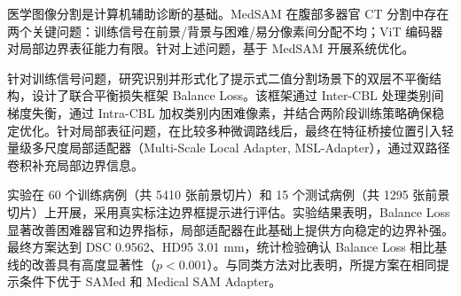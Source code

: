医学图像分割是计算机辅助诊断的基础。MedSAM 在腹部多器官 CT 分割中存在两个关键问题：训练信号在前景/背景与困难/易分像素间分配不均；ViT 编码器对局部边界表征能力有限。针对上述问题，基于 MedSAM 开展系统优化。

针对训练信号问题，研究识别并形式化了提示式二值分割场景下的双层不平衡结构，设计了联合平衡损失框架 Balance Loss。该框架通过 Inter-CBL 处理类别间梯度失衡，通过 Intra-CBL 加权类别内困难像素，并结合两阶段训练策略确保稳定优化。针对局部表征问题，在比较多种微调路线后，最终在特征桥接位置引入轻量级多尺度局部适配器（Multi-Scale Local Adapter, MSL-Adapter），通过双路径卷积补充局部边界信息。

实验在 60 个训练病例（共 5410 张前景切片）和 15 个测试病例（共 1295 张前景切片）上开展，采用真实标注边界框提示进行评估。实验结果表明，Balance Loss 显著改善困难器官和边界指标，局部适配器在此基础上提供方向稳定的边界补强。最终方案达到 DSC 0.9562、HD95 3.01 mm，统计检验确认 Balance Loss 相比基线的改善具有高度显著性（$p<0.001$）。与同类方法对比表明，所提方案在相同提示条件下优于 SAMed 和 Medical SAM Adapter。
